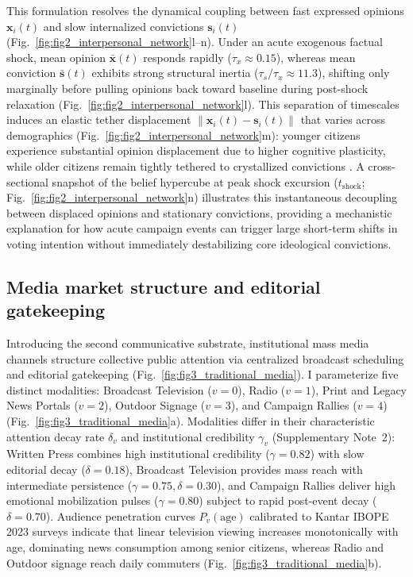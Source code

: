 \documentclass[11pt,a4paper]{article}
\begin{document}
This formulation resolves the dynamical coupling between fast expressed opinions $\mathbf{x}_i(t)$ and slow internalized convictions $\mathbf{s}_i(t)$ \citep{zaller1992nature, howe2017attitude} (Fig.~\ref{fig:fig2_interpersonal_network}l--n). Under an acute exogenous factual shock, mean opinion $\bar{\mathbf{x}}(t)$ responds rapidly ($\tau_x \approx 0.15$), whereas mean conviction $\bar{\mathbf{s}}(t)$ exhibits strong structural inertia ($\tau_s / \tau_x \approx 11.3$), shifting only marginally before pulling opinions back toward baseline during post-shock relaxation (Fig.~\ref{fig:fig2_interpersonal_network}l). This separation of timescales induces an elastic tether displacement $\|\mathbf{x}_i(t) - \mathbf{s}_i(t)\|$ that varies across demographics (Fig.~\ref{fig:fig2_interpersonal_network}m): younger citizens experience substantial opinion displacement due to higher cognitive plasticity, while older citizens remain tightly tethered to crystallized convictions \citep{alwin1991aging}. A cross-sectional snapshot of the belief hypercube at peak shock excursion ($t_{\mathrm{shock}}$; Fig.~\ref{fig:fig2_interpersonal_network}n) illustrates this instantaneous decoupling between displaced opinions and stationary convictions, providing a mechanistic explanation for how acute campaign events can trigger large short-term shifts in voting intention without immediately destabilizing core ideological convictions.

\subsection*{Media market structure and editorial gatekeeping}

Introducing the second communicative substrate, institutional mass media channels structure collective public attention via centralized broadcast scheduling and editorial gatekeeping \citep{mccombs1972agenda} (Fig.~\ref{fig:fig3_traditional_media}). I parameterize five distinct modalities: Broadcast Television ($v = 0$), Radio ($v = 1$), Print and Legacy News Portals ($v = 2$), Outdoor Signage ($v = 3$), and Campaign Rallies ($v = 4$) (Fig.~\ref{fig:fig3_traditional_media}a). Modalities differ in their characteristic attention decay rate $\delta_v$ and institutional credibility $\gamma_v$ (Supplementary Note~2): Written Press combines high institutional credibility ($\gamma = 0.82$) with slow editorial decay ($\delta = 0.18$), Broadcast Television provides mass reach with intermediate persistence ($\gamma = 0.75, \delta = 0.30$), and Campaign Rallies deliver high emotional mobilization pulses ($\gamma = 0.80$) subject to rapid post-event decay ($\delta = 0.70$). Audience penetration curves $P_v(\mathrm{age})$ calibrated to Kantar IBOPE 2023 surveys \citep{kantar2023inside} indicate that linear television viewing increases monotonically with age, dominating news consumption among senior citizens, whereas Radio and Outdoor signage reach daily commuters (Fig.~\ref{fig:fig3_traditional_media}b).
\end{document}
